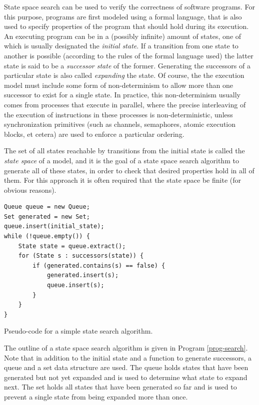 \documentclass{acm_proc_article-sp}
\begin{document}
State space search can be used to verify the correctness of software programs. For this purpose, programs are first modeled using a formal language, that is also used to specify properties of the program that should hold during its
execution. An executing program can be in a (possibly infinite) amount of states,
one of which is usually designated the \emph{initial state}. If a transition
from one state to another is possible (according to the rules of the formal
language used) the latter state is said to be a \emph{successor state} of the
former.
Generating the successors of a particular state is also called
\emph{expanding} the state. Of course, the the execution model
must include some form of non-determinism to allow more than one successor to
exist for a single state.
In practice, this non-determinism usually comes from processes that execute in
parallel, where the precise interleaving of the execution of
instructions in these processes is non-deterministic, unless synchronization
primitives (such as channels, semaphores, atomic execution blocks, et cetera)
are used to enforce a particular ordering.

The set of all states reachable by transitions from the initial state is called
the \emph{state space} of a model, and it is the goal of a state space search
algorithm to generate all of these states, in order to check that desired
properties hold in all of them. For this approach it is often required that
the state space be finite (for obvious reasons).

\begin{program}
\begin{verbatim}
Queue queue = new Queue;
Set generated = new Set;
queue.insert(initial_state);
while (!queue.empty()) {
    State state = queue.extract();
    for (State s : successors(state)) {
        if (generated.contains(s) == false) {
            generated.insert(s);
            queue.insert(s);
        }
    }
}
\end{verbatim}
\caption{Pseudo-code for a simple state search algorithm.}
\label{prog-search}
\end{program}

The outline of a state space search algorithm is given in Program
\ref{prog-search}. Note that in addition to the initial state and a function
to generate successors, a queue and a set data structure are used. The queue
holds states that have been generated but not yet expanded and is used to
determine what state to expand next. The set holds all states that have been
generated so far and is used to prevent a single state from being expanded
more than once.
\end{document}
